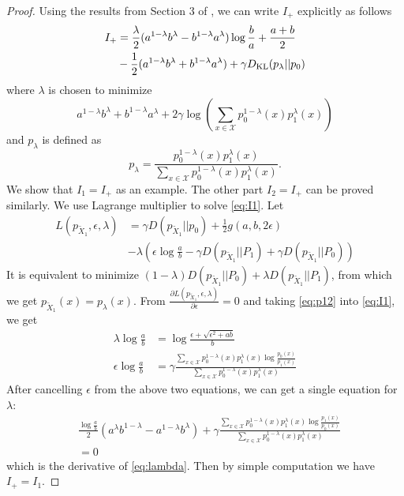 \documentclass[conference]{IEEEtran}
\begin{document}
	\begin{proof}
Using the results from Section 3 of \cite{abbe17sideinfo}, we can write $I_+$
explicitly as follows
\begin{align}\label{equation:I+}
    I_+ &=\frac{\lambda}{2} (a^{1-\lambda}b^{\lambda} -
    b^{1-\lambda}a^{\lambda})\log\frac{b}{a}+\frac{a+b}{2}\notag \\
    &-\frac{1}{2}(a^{1-\lambda}b^{\lambda} +
    b^{1-\lambda}a^{\lambda})+\gamma D_{\mathrm{KL}}(p_{\lambda}||p_0) 
	\end{align}
	where $\lambda$ is chosen to
	minimize
	\begin{equation}\label{eq:lambda}
     a^{1-\lambda}b^{\lambda} +
    b^{1-\lambda}a^{\lambda} + 2\gamma \log(\sum_{x\in \mathcal{X}}p^{1-\lambda}_0(x) p^{\lambda}_1(x))
\end{equation}
and $p_{\lambda}$ is defined as
\begin{equation}\label{eq:p12}
p_{\lambda}= \frac{p_0^{1-\lambda}(x)p_1^{\lambda}(x)}{\sum_{x \in \mathcal{X}}p_0^{1-\lambda}(x) p_1^{\lambda} (x)}.
\end{equation}
We show that $I_1=I_+$ as an example.
The other part $I_2=I_+$ can be proved
similarly.
We use Lagrange multiplier to solve \eqref{eq:I1}.
Let
\begin{align*}
L(p_{\widetilde{X}_1},\epsilon, \lambda)
&=\gamma D(p_{\widetilde{X}_1}|| p_0)+ \frac{1}{2} g(a,b, 2\epsilon)\\
&- \lambda(\epsilon \log\frac{a}{b}-\gamma
D(p_{\widetilde{X}_1} || P_1) + \gamma D(p_{\widetilde{X}_1} || P_0))
\end{align*}
It is equivalent to minimize
$(1-\lambda)D(p_{\widetilde{X}_1} || P_0) +
\lambda D(p_{\widetilde{X}_1} || P_1) $, from
which we get $p_{\widetilde{X}_1}(x) = p_{\lambda}(x)$.
From $\frac{\partial L(p_{\widetilde{X}_1},\epsilon, \lambda)}{\partial \epsilon}=0$ and taking \eqref{eq:p12}
into \eqref{eq:I1}, we get
\begin{align*}
    \lambda \log \frac{a}{b}
    & = \log \frac{\epsilon + \sqrt{\epsilon^2+ab}}{b} \\
    \epsilon \log \frac{a}{b}
    & = \gamma\frac{\sum_{x \in \mathcal{X}}p_0^{1-\lambda}(x) p_1^{\lambda} (x)\log \frac{p_0(x)}{p_1(x)}}{\sum_{x \in \mathcal{X}}p_0^{1-\lambda}(x) p_1^{\lambda} (x)}
\end{align*}
After cancelling $\epsilon$
from the above two equations, we can get a single equation
for $\lambda$:
\begin{align*}
    &\frac{\log\frac{a}{b}}{2}
    (a^{\lambda} b^{1-\lambda}
    -a^{1-\lambda} b^{\lambda})
    + \gamma \frac{\sum_{x \in \mathcal{X}}p_0^{1-\lambda}(x) p_1^{\lambda} (x)\log \frac{p_1(x)}{p_0(x)}}{\sum_{x \in \mathcal{X}}p_0^{1-\lambda}(x) p_1^{\lambda} (x)}\\
    &=0
\end{align*}
which is the derivative of \eqref{eq:lambda}.
Then by simple computation we have
$I_+ = I_1$. 
\end{proof}
\end{document}
